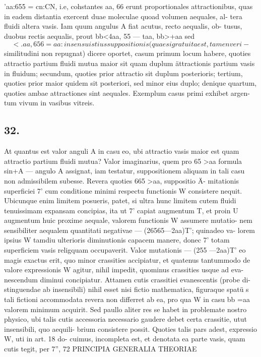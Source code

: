 \documentclass[12pt,a4paper]{article}
\begin{document}
'aa:655 = cn:CN,         i.e, cohstantes   aa, 66 erunt proportionales attractionibus,
quas in eadem distantia exercent duae moleculae quoad volumen aequales, al-
tera fluidi altera vasis. Iam quum angulus A fiat acutus, recto aequalis, ob-
tusus, duobus rectis aequalis, prout bb<4aa, 55 --- taa, bb>+aa sed
\[<.aa, 656 = aa: in sensu istius suppositionis (quae si gratuita est, tamen veri-\]
similitudini non repugnat) dicere oportet, casum primum locum habere, quoties
attractio partium fluidi mutua maior sit quam duplum ättractionis partium vasis
in fluidum; secundum, quoties prior attractio sit duplum posterioris; tertium,
quoties prior maior quidem sit posteriori, sed minor eius duplo; denique quartum,
quoties ambae attractiones sint aequales.   Exemplum casus primi exhibet argen-
tum vivum in vasibus vitreis.



\subsection*{32.}

At quantus est valor anguli A in casu eo, ubi attractio vasis maior est
quam attractio partium fluidi mutua?   Valor imaginarius, quem pro 65 >aa
formula sin+A ---       angulo A assignat, iam testatur, suppositionem aliquam
in tali casu non admissibilem subesse.           Revera quoties    665 >aa,   suppositio Ä-
mitationis superficiei   7' cum conditione minimi respectu functionis         W consistere
nequit.    Ubicunque enim limitem posueris, patet, si ultra hunc limitem cutem
fluidi tenuissimam expansam concipias, ita ut 7' capiat augmentum              T, et proin
U augmentum huic proxime aequale, valorem functionis W assumere mutatio-
nem sensibiliter aequalem quantitati negativae --- (26565---2aa)T'; quinadeo va-
lorem ipsius W tamdiu ulterioris diminutionis capacem manere, donec 7' totam
superficiem vasis religquam occupaverit. Valor mutationis --- (255 ---2aa)T' eo
magis exactus erit, quo minor crassities accipiatur, et quatenus tantummodo de
valore expressionis W agitur, nihil impedit, quominus crassities usque ad eva-
nescendum diminui concipiatur.         Attamen cutis crassitiei evanescentis (probe di-
stinguendae ab insensibili) nihil esset nisi fictio mathematica,        figuraque spatü s
tali fictioni accommodata revera non differret ab ea, pro qua W in casu bb =aa
valorem minimum acquirit.
Sed paullo aliter res se habet in problemate nostro physico, ubi talis cutis
accessoria necessario gaudere debet certa crassitie, utut insensibili, quo aequili-
brium consistere possit. Quoties talis pars adest, expressio W, uti in art. 18 do-
cuimus, incompleta est, et denotata ea parte vasis, quam cutis tegit, per 7'',
72                            PRINCIPIA GENERALIA THEORIAE
\end{document}
